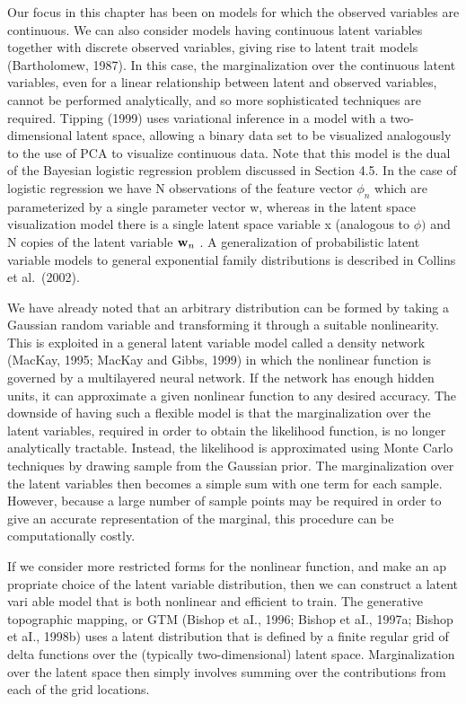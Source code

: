 \documentclass[
  10
]{article}
\begin{document}
Our focus in this chapter has been on models for which the observed
variables are continuous. We can also consider models having continuous
latent variables together with discrete observed variables, giving rise
to latent trait models (Bartholomew, 1987). In this case, the
marginalization over the continuous latent variables, even for a linear
relationship between latent and observed variables, cannot be performed
analytically, and so more sophisticated techniques are required. Tipping
(1999) uses variational inference in a model with a two-dimensional
latent space, allowing a binary data set to be visualized analogously to
the use of PCA to visualize continuous data. Note that this model is the
dual of the Bayesian logistic regression problem discussed in Section
4.5. In the case of logistic regression we have N observations of the
feature vector \(\phi _ { n }\) which are parameterized by a single
parameter vector w, whereas in the latent space visualization model
there is a single latent space variable x (analogous to \(\phi )\) and N
copies of the latent variable \({ \bf w } _ { n }\) . A generalization
of probabilistic latent variable models to general exponential family
distributions is described in Collins et al.~(2002).

We have already noted that an arbitrary distribution can be formed by
taking a Gaussian random variable and transforming it through a suitable
nonlinearity. This is exploited in a general latent variable model
called a density network (MacKay, 1995; MacKay and Gibbs, 1999) in which
the nonlinear function is governed by a multilayered neural network. If
the network has enough hidden units, it can approximate a given
nonlinear function to any desired accuracy. The downside of having such
a flexible model is that the marginalization over the latent variables,
required in order to obtain the likelihood function, is no longer
analytically tractable. Instead, the likelihood is approximated using
Monte Carlo techniques by drawing sample from the Gaussian prior. The
marginalization over the latent variables then becomes a simple sum with
one term for each sample. However, because a large number of sample
points may be required in order to give an accurate representation of
the marginal, this procedure can be computationally costly.

If we consider more restricted forms for the nonlinear function, and
make an ap propriate choice of the latent variable distribution, then we
can construct a latent vari able model that is both nonlinear and
efficient to train. The generative topographic mapping, or GTM (Bishop
et aI., 1996; Bishop et aI., 1997a; Bishop et aI., 1998b) uses a latent
distribution that is defined by a finite regular grid of delta functions
over the (typically two-dimensional) latent space. Marginalization over
the latent space then simply involves summing over the contributions
from each of the grid locations.
\end{document}
